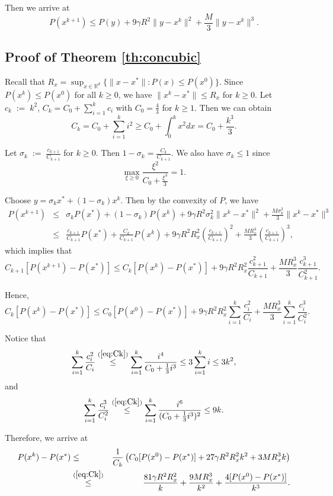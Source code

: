 \documentclass[10pt]{article}
\newcommand{\eqdef}{\; { := }\;}
\newcommand{\R}{\mathbb{R}}
\begin{document}
Then we arrive at 
$$
P(x^{k+1}) \leq P(y) + 9\gamma R^2 \|y-x^k\|^2 + \frac{M}{3}\|y-x^k\|^3. 
$$


\subsection{Proof of Theorem \ref{th:concubic}}

Recall that $R_x =\sup_{x\in \R^d} \{  \|x-x^*\| : P(x) \leq P(x^0)  \}$. Since $P(x^k) \leq P(x^0)$ for all $k\geq 0$, we have $\|x^k - x^*\| \leq R_x$ for $k\geq 0$.  Let $c_k \eqdef k^2$, $C_k = C_0 + \sum_{i=1}^kc_i$ with $C_0=\frac{4}{3}$ for $k\geq 1$. Then we can obtain  
\begin{equation}\label{eq:Ck}
C_k = C_0 + \sum_{i=1}^k i^2 \geq C_0 + \int_{0}^k x^2 dx = C_0 + \frac{k^3}{3}. 
\end{equation}

Let $\sigma_k \eqdef \frac{c_{k+1}}{C_{k+1}}$ for $k\geq 0$. Then $1 - \sigma_k = \frac{C_k}{C_{k+1}}$. We also have $\sigma_k \leq 1$ since 
$$
\max_{\xi\geq 0} \frac{\xi^2}{C_0 + \frac{\xi^3}{3}} =1. 
$$

Choose $y = \sigma_k x^* + (1-\sigma_k)x^k$. Then by the convexity of $P$, we have 
\begin{eqnarray*}
	P(x^{k+1}) &\leq& \sigma_k P(x^*) + (1-\sigma_k) P(x^k) + 9\gamma R^2 \sigma_k^2 \|x^k - x^*\|^2 + \frac{M \sigma_k^3}{3}\|x^k-x^*\|^3 \\ 
	&\leq& \frac{c_{k+1}}{C_{k+1}}P(x^*) + \frac{C_k}{C_{k+1}}P(x^k) + 9\gamma R^2R_x^2 \left(  \frac{c_{k+1}}{C_{k+1}}  \right)^2 + \frac{MR_x^3}{3} \left(  \frac{c_{k+1}}{C_{k+1}}  \right)^3, 
\end{eqnarray*}
which implies that 
$$
C_{k+1} [P(x^{k+1}) - P(x^*)] \leq C_k [P(x^k) - P(x^*)] + 9\gamma R^2R_x^2 \frac{c_{k+1}^2}{C_{k+1}} + \frac{MR_x^3}{3} \frac{c_{k+1}^3}{C_{k+1}^2}. 
$$

Hence, 
$$
C_k[P(x^k) - P(x^*)] \leq C_0[P(x^0) - P(x^*)] + 9\gamma R^2R_x^2 \sum_{i=1}^k \frac{c_i^2}{C_i} + \frac{MR_x^3}{3} \sum_{i=1}^k \frac{c_i^3}{C_i^2}. 
$$

Notice that 
$$
\sum_{i=1}^k \frac{c_i^2}{C_i} \overset{(\ref{eq:Ck})}{\leq} \sum_{i=1}^k \frac{i^4}{C_0 + \frac{1}{3}i^3}\leq 3 \sum_{i=1}^k i \leq 3k^2, 
$$
and 
$$
\sum_{i=1}^k \frac{c_i^3}{C_i^2}  \overset{(\ref{eq:Ck})}{\leq}  \sum_{i=1}^k \frac{i^6}{(C_0 + \frac{1}{3}i^3)^2} \leq 9k. 
$$

Therefore, we arrive at 
\begin{eqnarray*}
	P(x^k) - P(x^*) &\leq& \frac{1}{C_k} \left(  C_0[P(x^0) - P(x^*)] + 27\gamma R^2R_x^2 k^2 + 3MR_x^3 k \right) \\ 
	&\overset{(\ref{eq:Ck})}{\leq}& \frac{81\gamma R^2 R_x^2}{k} + \frac{9MR_x^3}{k^2} + \frac{4[P(x^0) - P(x^*)]}{k^3}. 
\end{eqnarray*}
\end{document}
